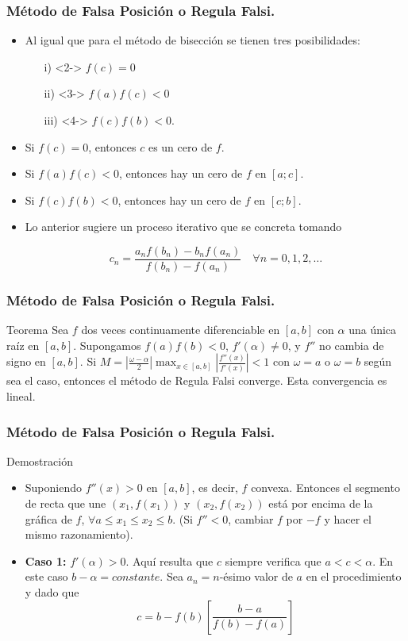 \documentclass{beamer}
\begin{document}
\begin{frame}[fragile]
  \frametitle{M\'etodo de Falsa Posici\'on o Regula Falsi.}
  \begin{itemize}
    \item<1-> Al igual que para el m\'etodo de bisecci\'on se tienen tres posibilidades:
      \begin{itemize}
        \item[i)]<2-> $f (c) = 0$  
        \item[ii)]<3-> $f (a)f (c) < 0$ 
        \item[iii)]<4-> $f (c)f (b) < 0$.
      \end{itemize}
      \item<5-> Si $f (c) = 0$, entonces $c$ es un cero de $f$.
      \item<6-> Si $f (a)f (c) < 0$, entonces hay un cero de $f$ en $[a; c]$.
      \item<7-> Si $f (c)f (b) < 0$, entonces hay un cero de $f$ en $[c; b]$.
      \item<8-> Lo anterior sugiere un proceso iterativo que se concreta tomando
      \begin{block}{}
      $$
      c_n = \frac{a_nf(b_n)-b_nf(a_n)}{f(b_n)-f(a_n)} \quad\forall n=0,1,2,\ldots
      $$  
      \end{block}      
    \end{itemize}  
\end{frame}
\begin{frame}
  \frametitle{M\'etodo de Falsa Posici\'on o Regula Falsi.}
  \begin{block}{Teorema}    
      Sea $f$ dos veces continuamente diferenciable en $[a,b]$ con $\alpha$ una \'unica ra\'iz en $[a,b]$. Supongamos
     $f(a)f(b)<0$, $f'(\alpha) \neq 0$, y $f''$ no cambia de signo en $[a,b]$. Si $M = \left|\frac{\omega -
     \alpha}{2}\right| \max_{x \in [a,b]}\left|\frac{f''(x)}{f'(x)}\right|<1$ con $\omega=a$ o $\omega=b$ seg\'un sea el
     caso, entonces el m\'etodo de Regula Falsi converge. Esta convergencia es lineal.     
  \end{block}  
\end{frame}
\begin{frame}
  \frametitle{M\'etodo de Falsa Posici\'on o Regula Falsi.}
  \begin{block}{Demostraci\'on}
    \begin{itemize}      
      \item<1->Suponiendo $f''(x)>0$ en $[a,b]$, es decir, $f$ convexa. Entonces el segmento de recta que une $(x_1,f(x_1))$ y $(x_2,f(x_2))$ est\'a por encima de la gr\'afica de $f$, $\forall a\leq x_1 \leq x_2\leq b$. (Si
$f''<0$, cambiar $f$ por $-f$ y hacer el mismo razonamiento). 
\item<2->\textbf{Caso 1:} $f'(\alpha)>0$. Aqu\'i resulta que $c$ siempre verifica que $a<c<\alpha$. En este caso
$b-\alpha=constante$. Sea $a_n=n$-\'esimo valor de $a$ en el procedimiento y dado que
$$
c = b - f(b)\left[\frac{b-a}{f(b)-f(a)}\right]
$$    \end{itemize}
  \end{block}
\end{frame}
\end{document}
